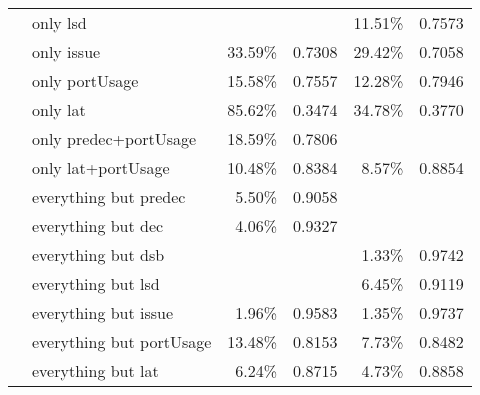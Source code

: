 \documentclass[sigconf,nonacm]{acmart}
\begin{document}
\begin{table}
\begin{center}
\begin{tabular}{llrcrc}
                      & only lsd  & & & 11.51\% & 0.7573\\
                      & only issue  & 33.59\% & 0.7308 & 29.42\% & 0.7058\\
                      & only portUsage  & 15.58\% & 0.7557 & 12.28\% & 0.7946\\
                      & only lat  & 85.62\% & 0.3474 & 34.78\% & 0.3770\\
                      & only predec+portUsage  & 18.59\% & 0.7806 & & \\
                      & only lat+portUsage  & 10.48\% & 0.8384 & 8.57\% & 0.8854\\
                      & everything but predec  & 5.50\% & 0.9058 & & \\
                      & everything but dec  & 4.06\% & 0.9327 & & \\
                      & everything but dsb  & & & 1.33\% & 0.9742\\
                      & everything but lsd  & & & 6.45\% & 0.9119\\
                      & everything but issue  & 1.96\% & 0.9583 & 1.35\% & 0.9737\\
                      & everything but portUsage  & 13.48\% & 0.8153 & 7.73\% & 0.8482\\
                      & everything but lat  & 6.24\% & 0.8715 & 4.73\% & 0.8858\\
\bottomrule
\end{tabular}
\end{center}
\end{table}

\clearpage
\appendix
\end{document}
